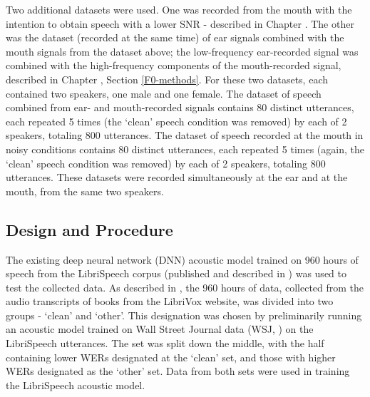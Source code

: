 Two additional datasets were used.  One was recorded from the mouth with the intention to obtain speech with a lower SNR - described in Chapter \DIFdelbegin {}\DIFdelend \DIFaddbegin {}\DIFaddend .  The other was the dataset (recorded at the same time) of ear signals combined with the mouth signals from the dataset above; the low-frequency ear-recorded signal was combined with the high-frequency components of the mouth-recorded signal, described in Chapter \DIFdelbegin {}\DIFdelend \DIFaddbegin \DIFadd{\ref{chapter3}}\DIFaddend , Section \ref{F0-methods}.
For these two datasets, each contained two speakers, one male and one female.  The dataset of speech combined from ear- and mouth-recorded signals contains 80 distinct utterances, each repeated 5 times (the `clean' speech condition was removed) by each of 2 speakers, totaling 800 utterances.  The dataset of speech recorded at the mouth in noisy conditions contains 80 distinct utterances, each repeated 5 times (again, the `clean' speech condition was removed) by each of 2 speakers, totaling 800 utterances.  These datasets were recorded simultaneously at the ear and at the mouth, from the same two speakers.

\DIFdelbegin %
\DIFdelend \DIFaddbegin \subsection{Design and Procedure}
\label{chap4:methods:design}
\DIFaddend 

The existing deep neural network (DNN) acoustic model trained on 960 hours of speech from the LibriSpeech corpus (published and described in \cite{panayotov:15}) was used to test the collected data.  As described in \cite{panayotov:15}, the 960 hours of data, collected from the audio transcripts of books from the LibriVox website, was divided into two groups - `clean' and `other'.  This designation was chosen by preliminarily running an acoustic model trained on Wall Street Journal data (WSJ, \cite{paul:92}) on the LibriSpeech utterances. The set was split down the middle, with the half containing lower WERs designated at the `clean' set, and those with higher WERs designated as the `other' set.  Data from both sets were used in training the LibriSpeech acoustic model.

